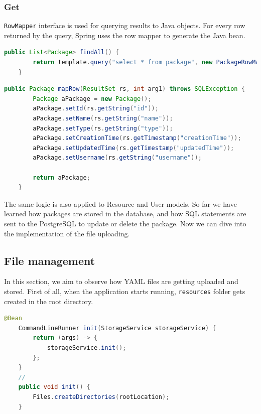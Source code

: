 \subsubsection{Get}
\texttt{RowMapper} interface is used for querying results to Java objects. For every row returned by the query, Spring uses the row mapper to generate the Java bean.
\begin{lstlisting}[language={Java}]
public List<Package> findAll() {
        return template.query("select * from package", new PackageRowMapper());
    }
\end{lstlisting}

\begin{lstlisting}[language={Java}]
public Package mapRow(ResultSet rs, int arg1) throws SQLException {
        Package aPackage = new Package();
        aPackage.setId(rs.getString("id"));
        aPackage.setName(rs.getString("name"));
        aPackage.setType(rs.getString("type"));
        aPackage.setCreationTime(rs.getTimestamp("creationTime"));
        aPackage.setUpdatedTime(rs.getTimestamp("updatedTime"));
        aPackage.setUsername(rs.getString("username"));

        return aPackage;
    }
\end{lstlisting}

The same logic is also applied to Resource and User models. So far we have learned how packages are stored in the database, and how SQL statements are sent to the PostgreSQL to update or delete the package. Now we can dive into the implementation of the file uploading.

\subsection{File management}
\label{subsec:file-management}

In this section, we aim to observe how YAML files are getting uploaded and stored. First of all, when the application starts running, \texttt{resources} folder gets created in the root directory.
\begin{lstlisting}[language={Java}]
    @Bean
    CommandLineRunner init(StorageService storageService) {
        return (args) -> {
            storageService.init();
        };
    }
    //
    public void init() {
        Files.createDirectories(rootLocation);
    }
\end{lstlisting}

